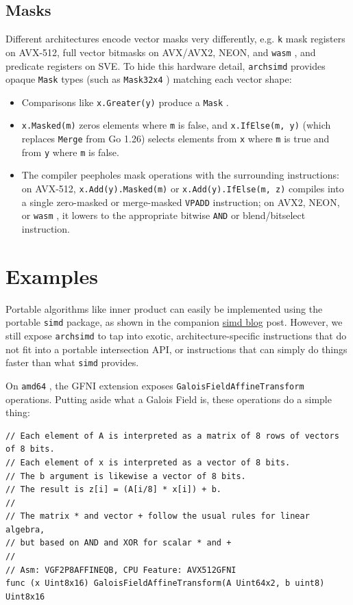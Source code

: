 \documentclass[11pt,a4paper]{article}
\begin{document}
\subsection{Masks}

Different architectures encode vector masks very differently, e.g. \texttt{k} mask registers on AVX-512, full vector bitmasks on AVX/AVX2, NEON, and \texttt{wasm} , and predicate registers on SVE. To hide this hardware detail, \texttt{archsimd} provides opaque \texttt{Mask} types (such as \texttt{Mask32x4} ) matching each vector shape:

\begin{itemize}
\item Comparisons like \texttt{x.Greater(y)} produce a \texttt{Mask} .
\item \texttt{x.Masked(m)} zeros elements where \texttt{m} is false, and \texttt{x.IfElse(m, y)} (which replaces \texttt{Merge} from Go 1.26) selects elements from \texttt{x} where \texttt{m} is true and from \texttt{y} where \texttt{m} is false.
\item The compiler peepholes mask operations with the surrounding instructions: on AVX-512, \texttt{x.Add(y).Masked(m)} or \texttt{x.Add(y).IfElse(m, z)} compiles into a single zero-masked or merge-masked \texttt{VPADD} instruction; on AVX2, NEON, or \texttt{wasm} , it lowers to the appropriate bitwise \texttt{AND} or blend/bitselect instruction.
\end{itemize}

\section{Examples}

Portable algorithms like inner product can easily be implemented using the portable \texttt{simd} package, as shown in the companion \href{https://go.dev/blog/simd-experiment}{simd blog} post. However, we still expose \texttt{archsimd} to tap into exotic, architecture-specific instructions that do not fit into a portable intersection API, or instructions that can simply do things faster than what \texttt{simd} provides.

On \texttt{amd64} , the GFNI extension exposes \texttt{GaloisFieldAffineTransform} operations. Putting aside what a Galois Field is, these operations do a simple thing:

\begin{verbatim}
// Each element of A is interpreted as a matrix of 8 rows of vectors of 8 bits.
// Each element of x is interpreted as a vector of 8 bits.
// The b argument is likewise a vector of 8 bits.
// The result is z[i] = (A[i/8] * x[i]) + b.
//
// The matrix * and vector + follow the usual rules for linear algebra,
// but based on AND and XOR for scalar * and +
//
// Asm: VGF2P8AFFINEQB, CPU Feature: AVX512GFNI
func (x Uint8x16) GaloisFieldAffineTransform(A Uint64x2, b uint8) Uint8x16
\end{verbatim}
\end{document}
